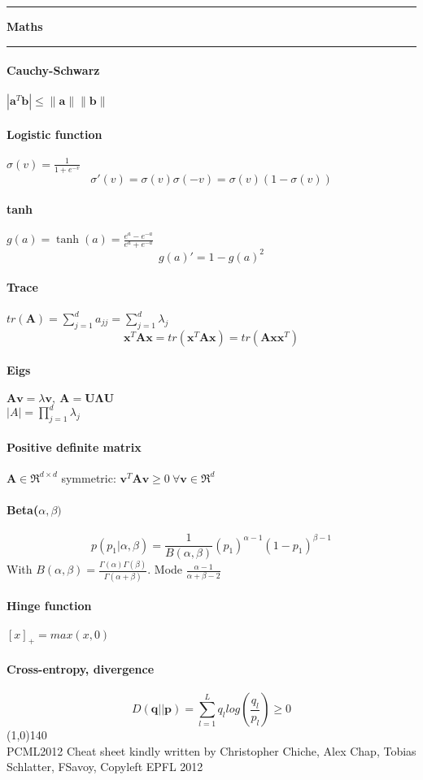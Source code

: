\documentclass[7pt]{scrartcl}
\newlength{\secskip}
\renewcommand{\section}[1]{
  \vspace{\secskip}
  \hrule\vspace{.3em}
  \textbf{#1}
  \vspace{.3em}
  \hrule
  \vspace{\secskip}
}
\renewcommand{\vec}{\mathbf}
\begin{document}
\begin{multicols}{4}
\section{Maths} 
\paragraph{Cauchy-Schwarz}
 $|\vec a ^T \vec b|\leq \| \vec a \| \| \vec b \|$
\paragraph{Logistic function}
$\sigma(v) = \frac{1}{1+e^{-v}}$
$$\sigma'(v) = \sigma(v)\sigma(-v) = \sigma(v)(1-\sigma(v))$$
\paragraph{tanh}
$g(a)=\tanh(a)=\frac{e^a-e^{-a}}{e^a + e^{-a}}$
$$g(a)'=1 - g(a)^2$$
\paragraph{Trace}
$tr(\vec{A}) = \sum_{j=1}^{d}a_{jj} = \sum_{j=1}^d \lambda_j$
\[\vec{x}^T \vec{A} \vec{x} = tr(\vec{x}^T \vec{A} \vec{x}) = tr(\vec{A} \vec{xx}^T)\]
\paragraph{Eigs}
$\vec{Av} = \lambda \vec{v}, ~\vec{A} = \vec{U \Lambda U}$\\
$|A| = \prod_{j=1}^d \lambda_j$
\paragraph{Positive definite matrix} $\vec A \in \Re^ {d\times d}$ symmetric:
$\vec v^T \vec A \vec v \geq 0 ~ \forall \vec v \in \Re^d$
\paragraph{Beta($\alpha,\beta)$}
\[p(p_1|\alpha,\beta) = \frac{1}{B(\alpha,\beta)}(p_1)^{\alpha-1}(1-p_1)^{\beta -1}\]
With $B(\alpha,\beta) = \frac{\Gamma(\alpha)\Gamma(\beta)}{\Gamma(\alpha + \beta)}$.
Mode $\frac{\alpha - 1}{\alpha + \beta - 2}$
\paragraph{Hinge function}
$[x]_+ = max(x,0)$
\paragraph{Cross-entropy, divergence}
\[D(\vec{q}||\vec{p}) = \sum_{l=1}^L q_l log(\frac{q_l}{p_l}) \geq 0\]
\line(1,0){140} \\
\tiny
PCML2012 Cheat sheet kindly written by Christopher Chiche, Alex Chap, Tobias Schlatter, FSavoy, Copyleft EPFL 2012 
\end{multicols}
\end{document}
